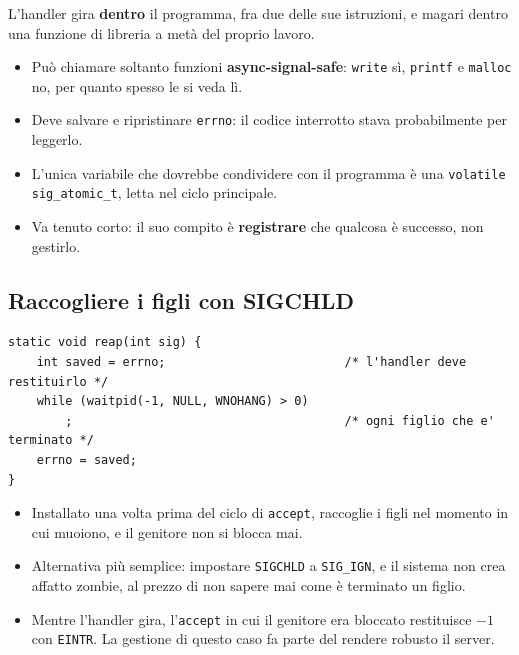 L'handler gira \textbf{dentro} il programma, fra due delle sue istruzioni, e magari dentro una funzione di libreria a metà
del proprio lavoro.
\begin{itemize}
    \item Può chiamare soltanto funzioni \textbf{async-signal-safe}: \texttt{write} sì, \texttt{printf} e \texttt{malloc} no,
          per quanto spesso le si veda lì.
    \item Deve salvare e ripristinare \texttt{errno}: il codice interrotto stava probabilmente per leggerlo.
    \item L'unica variabile che dovrebbe condividere con il programma è una \texttt{volatile sig\_atomic\_t}, letta nel ciclo
          principale.
    \item Va tenuto corto: il suo compito è \textbf{registrare} che qualcosa è successo, non gestirlo.
\end{itemize}

\subsection{Raccogliere i figli con SIGCHLD}

\begin{lstlisting}[language={[POSIX]C}, style=wnumbers, title={L'handler che raccoglie i figli}]
static void reap(int sig) {
    int saved = errno;                         /* l'handler deve restituirlo */
    while (waitpid(-1, NULL, WNOHANG) > 0)
        ;                                      /* ogni figlio che e' terminato */
    errno = saved;
}
\end{lstlisting}

\begin{itemize}
    \item Installato una volta prima del ciclo di \texttt{accept}, raccoglie i figli nel momento in cui muoiono, e il
          genitore non si blocca mai.
    \item Alternativa più semplice: impostare \texttt{SIGCHLD} a \texttt{SIG\_IGN}, e il sistema non crea affatto zombie,
          al prezzo di non sapere mai come è terminato un figlio.
    \item Mentre l'handler gira, l'\texttt{accept} in cui il genitore era bloccato restituisce $-1$ con \texttt{EINTR}. La
          gestione di questo caso fa parte del rendere robusto il server.
\end{itemize}


